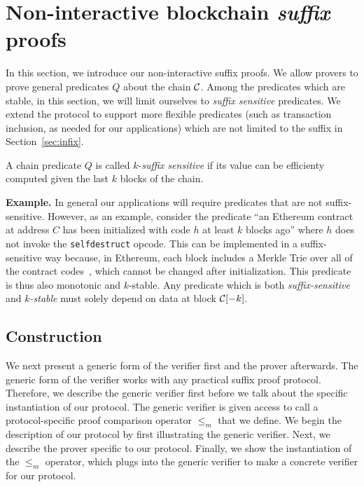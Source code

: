 \section{Non-interactive blockchain \emph{suffix} proofs}\label{sec:suffix}
In this section, we introduce our non-interactive suffix proofs.
We allow provers to prove general predicates $Q$ about the chain $\mathcal{C}$.
Among the predicates which are stable, in this section, we will limit ourselves
to \emph{suffix sensitive} predicates.
We extend the protocol to support more flexible predicates
(such as transaction inclusion, as needed for our applications) which are not
limited to the suffix in Section~\ref{sec:infix}.

\begin{definition}
A chain predicate $Q$ is called $k$-\emph{suffix sensitive} if its value
can be efficienty computed given the last $k$ blocks of the chain.
\end{definition}

\noindent\textbf{Example.}
In general our applications will require predicates that are not
suffix-sensitive. However, as an example, consider the predicate ``an Ethereum
contract at address $C$ has been initialized with code $h$ at least $k$ blocks
ago'' where $h$ does not invoke the \texttt{selfdestruct} opcode. This can be
implemented in a suffix-sensitive way because, in Ethereum, each block includes
a Merkle Trie over all of the contract codes~\cite{vitalik,wood}, which cannot be
changed after initialization. This predicate is thus also monotonic and
$k$-stable. Any predicate which is both \emph{suffix-sensitive} and
\emph{$k$-stable} must solely depend on data at block $\mathcal{C}[-k]$.

\subsection{Construction}
We next present a generic form of the verifier first and the prover afterwards.
The generic form of the verifier works with any practical suffix proof protocol.
Therefore, we describe the generic verifier first before we talk about the
specific instantiation of our protocol. The generic verifier is given access to
call a protocol-specific proof comparison operator $\leq_m$ that we define. We
begin the description of our protocol by first illustrating the generic
verifier. Next, we describe the prover specific to our protocol. Finally, we
show the instantiation of the $\leq_m$ operator, which plugs into the generic
verifier to make a concrete verifier for our protocol.

